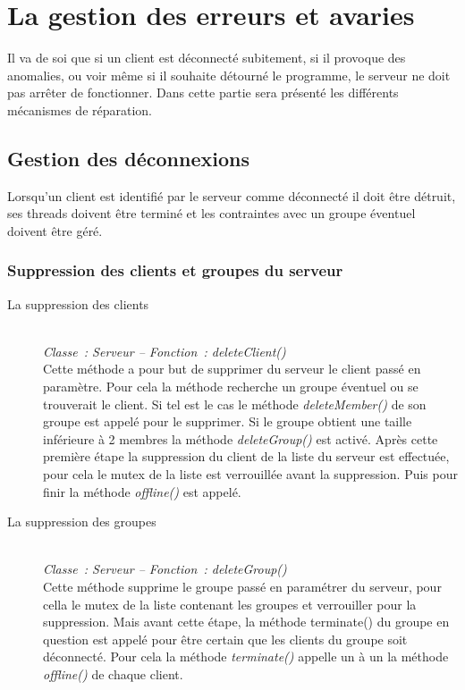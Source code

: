 \documentclass[a4paper,11pt]{report}
\begin{document}
\section{La gestion des erreurs et avaries}
  Il va de soi que si un client est déconnecté subitement, si il provoque des anomalies, ou voir même si il souhaite détourné le programme, le serveur ne doit pas arrêter de fonctionner. Dans cette partie sera présenté les différents mécanismes de réparation.

\subsection{Gestion des déconnexions}
  Lorsqu’un client est identifié par le serveur comme déconnecté il doit être détruit, ses threads doivent être terminé et les contraintes avec un groupe éventuel doivent être géré.

\subsubsection{Suppression des clients et groupes du serveur}

\begin{description}
  \item[La suppression des clients]
  \textit{\\Classe : Serveur – Fonction : deleteClient()\\}
    Cette méthode a pour but de supprimer du serveur le client passé en paramètre. Pour cela la méthode recherche un groupe éventuel ou se trouverait le client. Si tel est le cas le méthode \textit{deleteMember()} de son groupe est appelé pour le supprimer. Si le groupe obtient une taille inférieure à 2 membres la méthode  \textit{deleteGroup()} est activé.
Après cette première étape la suppression du client de la liste du serveur est effectuée, pour cela le mutex de la liste est verrouillée avant la suppression. Puis pour finir la méthode \textit{offline()} est appelé.
   
   \item[La suppression des groupes]
   \textit{\\Classe : Serveur – Fonction : deleteGroup()\\}
   Cette méthode supprime le groupe passé en paramétrer du serveur, pour cella le mutex de la liste contenant les groupes et verrouiller pour la suppression. Mais avant cette étape, la méthode terminate() du groupe en question est appelé pour être certain que les clients du groupe soit déconnecté. Pour cela la méthode \textit{terminate()} appelle un à un la méthode \textit{offline()} de chaque client.
\end{description}
\end{document}
